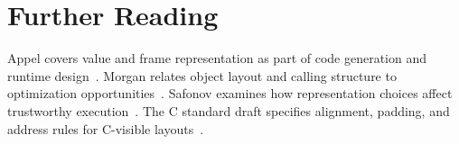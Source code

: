 \section{Further Reading}\label{sec:ch32-reading}

Appel covers value and frame representation as part of code generation and runtime design~\cite{appel-1998-modern}.
Morgan relates object layout and calling structure to optimization opportunities~\cite{morgan-1998-optimizing}.
Safonov examines how representation choices affect trustworthy execution~\cite{safonov-2010-trustworthy}.
The C standard draft specifies alignment, padding, and address rules for C-visible layouts~\cite{wg14-2011-c11}.
